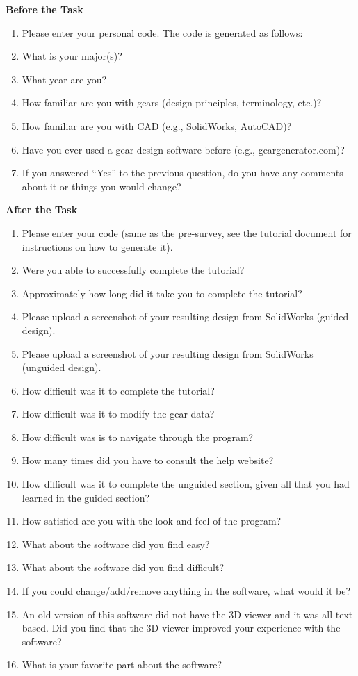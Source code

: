 \noindent\textbf{Before the Task}
\begin{enumerate}
    \item Please enter your personal code. The code is generated as follows:
    \item What is your major(s)?
    \item What year are you?
    \item How familiar are you with gears (design principles, terminology, etc.)?
    \item How familiar are you with CAD (e.g., SolidWorks, AutoCAD)?
    \item Have you ever used a gear design software before (e.g., geargenerator.com)?
    \item If you answered ``Yes'' to the previous question, do you have any comments about it or things you would change?
\end{enumerate}

\noindent\textbf{After the Task}
\begin{enumerate}
    \item Please enter your code (same as the pre-survey, see the tutorial document for instructions on how to generate it).
    \item Were you able to successfully complete the tutorial?
    \item Approximately how long did it take you to complete the tutorial?
    \item Please upload a screenshot of your resulting design from SolidWorks (guided design).
    \item Please upload a screenshot of your resulting design from SolidWorks (unguided design).
    \item How difficult was it to complete the tutorial?
    \item How difficult was it to modify the gear data?
    \item How difficult was is to navigate through the program?
    \item How many times did you have to consult the help website?
    \item How difficult was it to complete the unguided section, given all that you had learned in the guided section?
    \item How satisfied are you with the look and feel of the program?
    \item What about the software did you find easy?
    \item What about the software did you find difficult?
    \item If you could change/add/remove anything in the software, what would it be?
    \item An old version of this software did not have the 3D viewer and it was all text based. Did you find that the 3D viewer improved your experience with the software?
    \item What is your favorite part about the software?
\end{enumerate}

